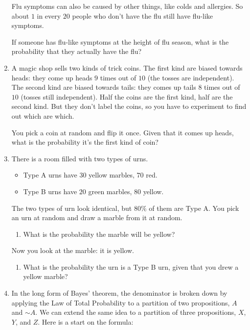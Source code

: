 \documentclass[justified]{tufte-book}
\providecommand{\tightlist}{%
  \setlength{\itemsep}{0pt}\setlength{\parskip}{0pt}}
\renewcommand{\neg}{\mathbin{\sim}}
\theoremstyle{definition}
\theoremstyle{definition}
\theoremstyle{definition}
\theoremstyle{remark}
\begin{document}
\begin{enumerate}
  Flu symptoms can also be caused by other things, like colds and
  allergies. So about \(1\) in every \(20\) people who don't have the
  flu still have flu-like symptoms.

  If someone has flu-like symptoms at the height of flu season, what is
  the probability that they actually have the flu?
\item
  A magic shop sells two kinds of trick coins. The first kind are biased
  towards heads: they come up heads \(9\) times out of \(10\) (the
  tosses are independent). The second kind are biased towards tails:
  they comes up tails \(8\) times out of \(10\) (tosses still
  independent). Half the coins are the first kind, half are the second
  kind. But they don't label the coins, so you have to experiment to
  find out which are which.

  You pick a coin at random and flip it once. Given that it comes up
  heads, what is the probability it's the first kind of coin?
\item
  There is a room filled with two types of urns.

  \begin{itemize}
  \tightlist
  \item
    Type A urns have \(30\) yellow marbles, \(70\) red.
  \item
    Type B urns have \(20\) green marbles, \(80\) yellow.
  \end{itemize}

  The two types of urn look identical, but \(80\%\) of them are Type A.
  You pick an urn at random and draw a marble from it at random.

  \begin{enumerate}
  \def\labelenumii{\alph{enumii}.}
  \tightlist
  \item
    What is the probability the marble will be yellow?
  \end{enumerate}

  Now you look at the marble: it is yellow.

  \begin{enumerate}
  \def\labelenumii{\alph{enumii}.}
  \setcounter{enumii}{1}
  \tightlist
  \item
    What is the probability the urn is a Type B urn, given that you drew
    a yellow marble?
  \end{enumerate}
\item
  In the long form of Bayes' theorem, the denominator is broken down by
  applying the Law of Total Probability to a partition of two
  propositions, \(A\) and \(\neg A\). We can extend the same idea to a
  partition of three propositions, \(X\), \(Y\), and \(Z\). Here is a
  start on the formula:


\end{enumerate}
\end{document}
